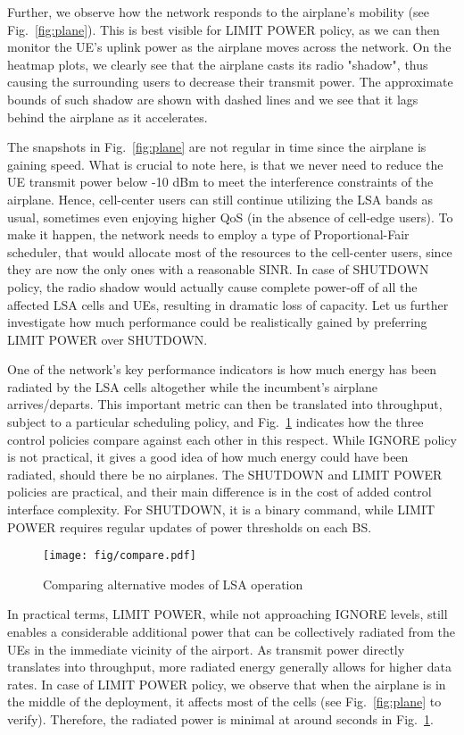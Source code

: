 \documentclass[journal]{IEEEtran}
\begin{document}
Further, we observe how the network responds to the airplane's mobility (see Fig.~\ref{fig:plane}). This is best visible for LIMIT POWER policy, as we can then monitor the UE's uplink power as the airplane moves across the network. On the heatmap plots, we clearly see that the airplane casts its radio "shadow", thus causing the surrounding users to decrease their transmit power. The approximate bounds of such shadow are shown with dashed lines and we see that it lags behind the airplane as it accelerates.

The snapshots in Fig.~\ref{fig:plane} are not regular in time since the airplane is gaining speed. What is crucial to note here, is that we never need to reduce the UE transmit power below -10 dBm to meet the interference constraints of the airplane. Hence, cell-center users can still continue utilizing the LSA bands as usual, sometimes even enjoying higher QoS (in the absence of cell-edge users). To make it happen, the network needs to employ a type of Proportional-Fair scheduler, that would allocate most of the resources to the cell-center users, since they are now the only ones with a reasonable SINR. In case of SHUTDOWN policy, the radio shadow would actually cause complete power-off of all the affected LSA cells and UEs, resulting in dramatic loss of capacity. Let us further investigate how much performance could be realistically gained by preferring LIMIT POWER over SHUTDOWN.

One of the network's key performance indicators is how much energy has been radiated by the LSA cells altogether while the incumbent's airplane arrives/departs. This important metric can then be translated into throughput, subject to a particular scheduling policy, and Fig.~\ref{fig:compare} indicates how the three control policies compare against each other in this respect. While IGNORE policy is not practical, it gives a good idea of how much energy could have been radiated, should there be no airplanes. The SHUTDOWN and LIMIT POWER policies are practical, and their main difference is in the cost of added control interface complexity. For SHUTDOWN, it is a binary command, while LIMIT POWER requires regular updates of power thresholds on each BS.

\begin{figure}[!ht]
\centering
\texttt{[image: fig/compare.pdf]}
\caption{Comparing alternative modes of LSA operation}
\label{fig:compare}
\end{figure}

In practical terms, LIMIT POWER, while not approaching IGNORE levels, still enables a considerable additional power that can be collectively radiated from the UEs in the immediate vicinity of the airport. As transmit power directly translates into throughput, more radiated energy generally allows for higher data rates. In case of LIMIT POWER policy, we observe that when the airplane is in the middle of the deployment, it affects most of the cells (see Fig.~\ref{fig:plane} to verify). Therefore, the radiated power is minimal at around  seconds in Fig.~\ref{fig:compare}. 
\end{document}
